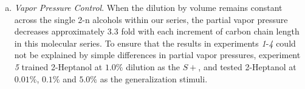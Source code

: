 \begin{enumerate}[(a)]
\item \textit{Vapor Pressure Control}. When the dilution by volume remains constant across the single 2-n alcohols within our series, the partial vapor pressure decreases approximately 3.3 fold with each increment of carbon chain length in this molecular series. 
To ensure that the results in experiments \textit{1}-\textit{4} could not be explained by simple differences in partial vapor pressures, experiment \textit{5} trained 2-Heptanol at $1.0\%$ dilution as the $S+$, and tested 2-Heptanol at $0.01\%$, $0.1\%$ and $5.0\%$ as the generalization stimuli.

\end{enumerate}

  
  
  
  
  
  
  